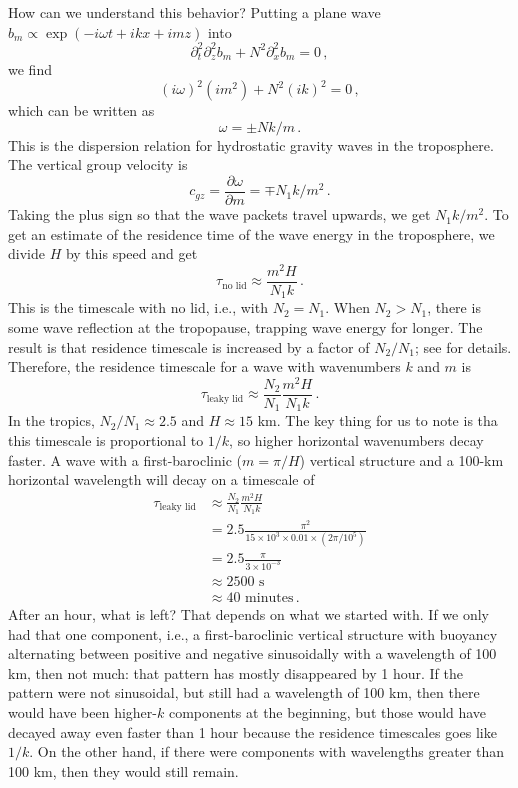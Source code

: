 \documentclass[12pt]{article}
\begin{document}
How can we understand this behavior?  Putting a plane wave $b_m \propto \exp(-i\omega t + ikx + imz)$ into 
\[
\partial_t^2 \partial_z^2 b_m + N^2 \partial_x^2 b_m = 0 \, ,
\]
we find
\[
(i\omega)^2 (im^2)+ N^2 (ik)^2 = 0 \, ,
\]
which can be written as
\[
\omega = \pm N k/m \, .
\]
This is the dispersion relation for hydrostatic gravity waves in the troposphere.  The vertical group velocity is
\[
c_{gz} = \frac{\partial \omega}{\partial m} = \mp N_1 k/m^2 \, .
\]
Taking the plus sign so that the wave packets travel upwards, we get $N_1k/m^2$.  To get an estimate of the residence time of the wave energy in the troposphere, we divide $H$ by this speed and get
\[
\tau_{\text{no lid}} \approx \frac{m^2 H}{N_1 k} \, .
\]
This is the timescale with no lid, i.e., with $N_2 = N_1$.  When $N_2 > N_1$, there is some wave reflection at the tropopause, trapping wave energy for longer.  The result is that residence timescale is increased by a factor of $N_2/N_1$; see \citet{15leaky} for details.  Therefore, the residence timescale for a wave with wavenumbers $k$ and $m$ is
\[
\tau_{\text{leaky lid}} \approx \frac{N_2}{N_1} \frac{m^2 H}{N_1 k} \, .
\]
In the tropics, $N_2/N_1 \approx 2.5$ and $H \approx 15$ km.  The key thing for us to note is tha this timescale is proportional to $1/k$, so higher horizontal wavenumbers decay faster.  A wave with a first-baroclinic ($m = \pi/H$) vertical structure and a 100-km horizontal wavelength will decay on a timescale of
\begin{align}
\tau_{\text{leaky lid}} &\approx \frac{N_2}{N_1} \frac{m^2 H}{N_1 k} \\
&= 2.5 \frac{\pi^2}{15 \times 10^3 \times 0.01 \times (2\pi/10^5)} \\
&= 2.5 \frac{\pi}{3 \times 10^{-3}} \\
&\approx 2500 \text{ s} \\
&\approx 40 \text{ minutes} \, .
\end{align}
After an hour, what is left?  That depends on what we started with.  If we only had that one component, i.e., a first-baroclinic vertical structure with buoyancy alternating between positive and negative sinusoidally with a wavelength of 100 km, then not much: that pattern has mostly disappeared by 1 hour.  If the pattern were not sinusoidal, but still had a wavelength of 100 km, then there would have been higher-$k$ components at the beginning, but those would have decayed away even faster than 1 hour because the residence timescales goes like $1/k$.  On the other hand, if there were components with wavelengths greater than 100 km, then they would still remain.
\end{document}
